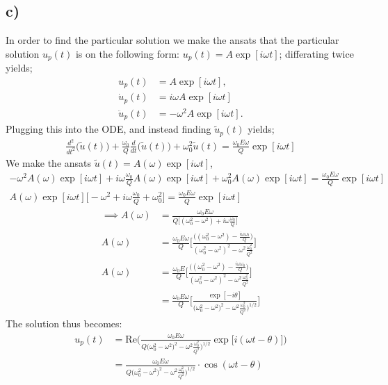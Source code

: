 \documentclass{article}
\begin{document}
\subsection*{c)}
In order to find the particular solution we make the ansats that the particular solution $u_p(t)$ is on the following form: $u_p(t) = A\exp[i\omega t]$; differating twice yields;
\begin{align*}
    u_p(t) &= A\exp[i\omega t],\\
    \dot{u}_p(t) &= i\omega A\exp[i\omega t]\\
    \ddot{u}_p(t) &= -\omega^2A\exp[i\omega t].
\end{align*}Plugging this into the ODE, and instead finding $\tilde{u}_p(t)$ yields;
\begin{align*}
    \frac{d^2}{dt^2}\big(\tilde{u}(t)\big) + \frac{\omega_0}{Q}\frac{d}{dt}\big(\tilde{u}(t)\big) + \omega_0^2\tilde{u}(t) = \frac{\omega_0E\omega}{Q}\exp[i\omega t]
\end{align*}We make the ansats $\tilde{u}(t) = A(\omega)\exp[i\omega t]$,
\begin{align*}
    -\omega^2A(\omega)\exp[i\omega t] + i\omega\frac{\omega_0}{Q} A(\omega)\exp[i\omega t] + \omega_0^2A(\omega)\exp[i\omega t] = \frac{\omega_0E\omega}{Q}\exp[i\omega t]\\
    A(\omega)\exp[i\omega t]\Bigg[-\omega^2 + i\omega\frac{\omega_0}{Q} + \omega_0^2\Bigg] = \frac{\omega_0E\omega}{Q}\exp[i\omega t]
\end{align*}
\begin{align*}
    \implies A(\omega) &= \frac{\omega_0E\omega}{Q\Big[(\omega_0^2-\omega^2) + i\omega\frac{\omega_0}{Q}\Big]}\\
    A(\omega)&=\frac{\omega_0E\omega}{Q}\Bigg[\frac{\Big((\omega_0^2-\omega^2) - \frac{i\omega\omega_0}{Q}\Big)}{(\omega_0^2-\omega^2)^2 - \omega^2 \frac{\omega_0^2}{Q^2}}\Bigg]\\
    A(\omega)&=\frac{\omega_0E}{Q}\Bigg[\frac{\Big((\omega_0^2-\omega^2) - \frac{i\omega\omega_0}{Q}\Big)}{(\omega_0^2-\omega^2)^2 - \omega^2 \frac{\omega_0^2}{Q^2}}\Bigg]\\
    &=\frac{\omega_0E\omega}{Q}\Bigg[\frac{\exp[-i\theta]}{\Big(\omega_0^2-\omega^2)^2 - \omega^2 \frac{\omega_0^2}{Q^2}\Big)^{1/2}}\Bigg]
\end{align*} The solution thus becomes:
\begin{align*}
    u_p(t) &=\mathrm{Re}\Bigg(\frac{\omega_0E\omega}{Q\Big(\omega_0^2-\omega^2)^2 - \omega^2 \frac{\omega_0^2}{Q^2}\Big)^{1/2}}\exp\Big[i(\omega t -\theta)\Big]\Bigg)\\
    &=\frac{\omega_0E\omega}{Q\Big(\omega_0^2-\omega^2)^2 - \omega^2 \frac{\omega_0^2}{Q^2}\Big)^{1/2}}\cdot\cos(\omega t - \theta)
\end{align*}
\end{document}
